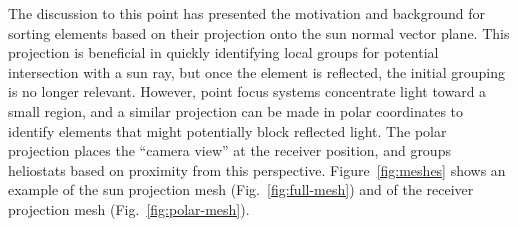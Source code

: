 \documentclass[11pt,letterpaper]{article}
\begin{document}
The discussion to this point has presented the motivation and background for sorting elements based on their projection onto the sun normal vector plane. 
This projection is beneficial in quickly identifying local groups for potential intersection with a sun ray, but once the element is reflected, the initial grouping is no longer relevant. 
However, point focus systems concentrate light toward a small region, and a similar projection can be made in polar coordinates to identify elements that might potentially block reflected light. 
The polar projection places the ``camera view'' at the receiver position, and groups heliostats based on proximity from this perspective. 
Figure~\ref{fig:meshes} shows an example of the sun projection mesh (Fig.~\ref{fig:full-mesh}) and of the receiver projection mesh (Fig.~\ref{fig:polar-mesh}). 
\end{document}
